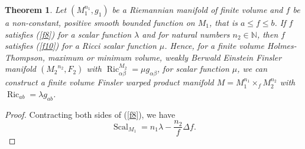 \documentclass[pdflatex,sn-mathphys-num]{sn-jnl}%
\theoremstyle{thmstyleone}%
\newtheorem{theorem}{Theorem}%
\theoremstyle{thmstyletwo}%
\theoremstyle{thmstylethree}%
\begin{document}
	\begin{theorem}\label{exist}
		Let $(M_{1}^{n_1}, g_1)$ be a Riemannian manifold of finite volume and  $f$ be a non-constant, positive  smooth  bounded function on $M_1$, that is $a \leq f \leq b$. If  $f$ satisfies (\ref{f8}) for a scalar function $\lambda$ and for natural numbers $n_2\in\mathbb{N}$, then $f$ satisfies (\ref{f10}) for a Ricci scalar function $\mu$. Hence, for a finite volume Holmes-Thompson, maximum or minimum volume, weakly Berwald Einstein Finsler manifold  $({M_2}^{n_2}, F_2)$ with $\operatorname{Ric}_{\alpha\beta}^{M_2}=\mu g_{\alpha\beta}$, for  scalar function $\mu$, we can construct a finite volume Finsler warped product manifold $M=M_{1}^{n_1}\times_{f}M_{2}^{n_2}$ with $\operatorname{Ric}_{ab}=\lambda g_{ab}$.   
	\end{theorem}
\begin{proof}
		 Contracting both sides of (\ref{f8}), we have
		\begin{equation*}
			\operatorname{Scal}_{M_1}=n_1\lambda -\frac{n_2}{f}\Delta f.
		\end{equation*}
		

\end{proof}
\end{document}
